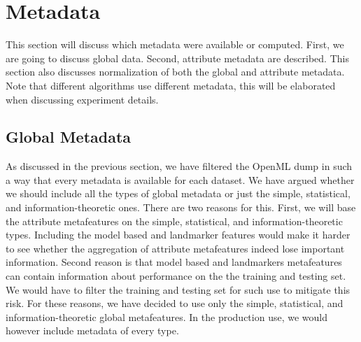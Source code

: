 \section{Metadata}
This section will discuss which metadata were available or computed. First, we are going to discuss global data. Second, attribute metadata are described. This section also discusses normalization of both the global and attribute metadata. Note that different algorithms use different metadata, this will be elaborated when discussing experiment details.

\subsection{Global Metadata}
 As discussed in the previous section, we have filtered the OpenML dump in such a way that every metadata is available for each dataset. 
 We have argued whether we should include all the types of global metadata or just the simple, statistical, and information-theoretic ones. There are two reasons for this. First, we will base the attribute metafeatures on the simple, statistical, and information-theoretic types. Including the model based and landmarker features would make it harder to see whether the aggregation of attribute metafeatures indeed lose important information. Second reason is that model based and landmarkers metafeatures can contain information about performance on the the training and testing set. We would have to filter the training and testing set for such use to mitigate this risk. For these reasons, we have decided to use only the simple, statistical, and information-theoretic global metafeatures. In the production use, we would however include metadata of every type.
 
